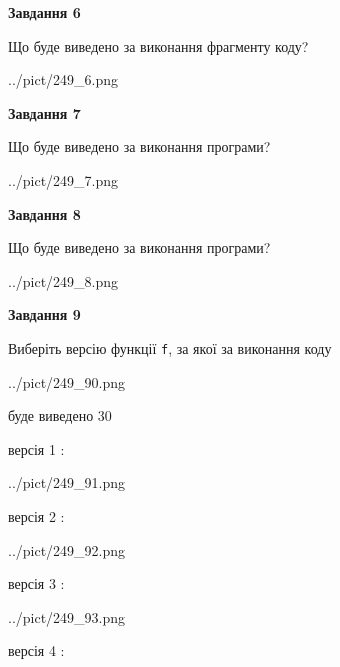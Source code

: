 \documentclass[12pt, ukrainian]{article}
\def\code#1{\Verb!#1!}
\begin{document}
{\begin {large}
{\begin {center}\textbf{Завдання 6}\end {center}}

Що буде виведено за виконання фрагменту коду?\par
\begin{center}
	{../pict/249_6.png}
\end{center}
\newpage

{\begin {center}\textbf{Завдання 7}\end {center}}

Що буде виведено за виконання програми?\par
\begin{center}
	{../pict/249_7.png}
\end{center}
\newpage

{\begin {center}\textbf{Завдання 8}\end {center}}

Що буде виведено за виконання програми?\par
\begin{center}
	{../pict/249_8.png}
\end{center}
\newpage

{\begin {center}\textbf{Завдання 9}\end {center}}

Виберіть версію функції \code{f}, за якої за виконання коду
\begin{center}
	{../pict/249_90.png}
\end{center}
буде виведено 30

\vspace{5mm}
версія 1 :

\begin{center}
	{../pict/249_91.png}
\end{center}
версія 2 :

\begin{center}
	{../pict/249_92.png}
\end{center}
версія 3 :

\begin{center}
	{../pict/249_93.png}
\end{center}
версія 4 :


\end{large}}
\end{document}
